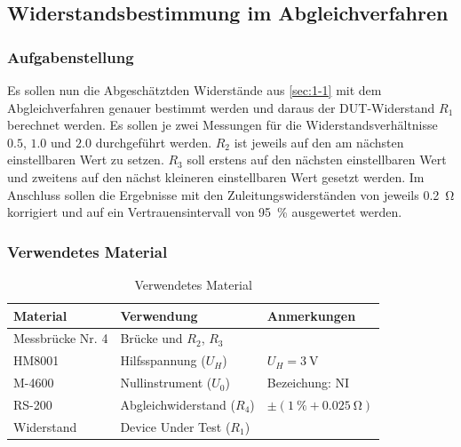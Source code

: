 \newpage
\subsection{Widerstandsbestimmung im Abgleichverfahren}\label{sec:1-2}

\subsubsection{Aufgabenstellung}

Es sollen nun die Abgeschätztden Widerstände aus \autoref{sec:1-1} mit dem
Abgleichverfahren genauer bestimmt werden und daraus der DUT-Widerstand $R_1$
berechnet werden. Es sollen je zwei Messungen für die Widerstandsverhältnisse
$0.5$, $1.0$ und $2.0$ durchgeführt werden. $R_2$ ist jeweils auf den am nächsten
einstellbaren Wert zu setzen. $R_3$ soll erstens auf den nächsten einstellbaren
Wert und zweitens auf den nächst kleineren einstellbaren Wert gesetzt werden.
Im Anschluss sollen die Ergebnisse mit den Zuleitungswiderständen von jeweils
\SI{0.2}{\ohm} korrigiert und auf ein Vertrauensintervall von \SI{95}{\percent}
ausgewertet werden.

\subsubsection{Verwendetes Material}

\begin{table}[h]
	\centering
	\caption{Verwendetes Material}
	\begin{tabularx}{\textwidth}{XXX}
		\textbf{Material} & \textbf{Verwendung}        & \textbf{Anmerkungen}                        \\ \midrule
		Messbrücke Nr. 4  & Brücke und $R_2$, $R_3$    &                                             \\
		HM8001            & Hilfsspannung ($U_H$)      & $U_H = \SI{3}{\volt}$                       \\
		M-4600            & Nullinstrument ($U_0$)     & Bezeichung: NI                              \\
		RS-200            & Abgleichwiderstand ($R_4$) & $\pm (\SI{1}{\percent} + \SI{0.025}{\ohm})$ \\
		Widerstand        & Device Under Test ($R_1$)  &                                             \\
	\end{tabularx}
\end{table}

